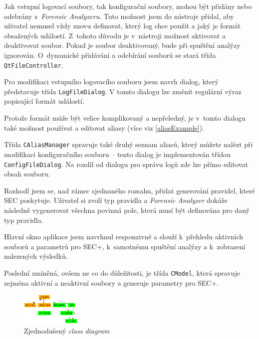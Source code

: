 \documentclass[thesis=B,czech]{FITthesis}[2012/06/26]
\begin{document}
Jak vstupní logovací soubory, tak konfigurační soubory, mohou být přidány nebo odebrány z~\textit{Forensic Analyzeru}. Tuto možnost jsem do nástroje přidal, aby uživatel nemusel vždy znovu definovat, který log chce použít a jaký je formát obsažených událostí. Z~tohoto důvodu je v~nástroji možnost aktivovat a deaktivovat soubor. Pokud je soubor deaktivovaný, bude při spuštění analýzy ignorován. O~dynamické přidávání a odebírání souborů se stará třída \texttt{QtFileController}.

Pro modifikaci vstupního logovacího souboru jsem navrh dialog, který představuje třída \texttt{LogFileDialog}. V tomto dialogu lze změnit regulární výraz popisující formát událostí. 

Protože formát může být velice komplikovaný a nepřeledný, je v~tomto dialogu také možnost používat a editovat aliasy (více viz \ref{aliasExample}).

Třída \texttt{CAliasManager} spravuje také druhý seznam aliasů, který můžete nalézt při modifikaci konfiguračního souboru -- tento dialog je implementován třídou \texttt{ConfigFileDialog}.
Na rozdíl od dialogu pro správu logů zde lze přímo editovat obsah souboru. 

Rozhodl jsem se, nad rámec sjednaného rozsahu, přidat generování pravidel, které SEC poskytuje. Uživatel si zvolí typ pravidla a \textit{Forensic Analyzer} dokáže následně vygenerovat všechna povinná pole, která musí být definována pro daný typ pravidla.

Hlavní okno aplikace jsem navrhnul responzivně a slouží k~přehledu aktivních souborů a parametrů pro SEC+, k~samotnému spuštění analýzy a k~zobrazení nalezených výsledků.

Poslední zmíněná, ovšem ne co do důležitosti, je třída \texttt{CModel}, která spravuje zejména aktivní a neaktivní soubory a generuje parametry pro SEC+.

\begin{figure}[h]
  \centering
  \includegraphics[width=\textwidth]{res/ClassDiagramSimple.eps}
  \caption{Zjednodušený \textit{class diagram}}
  \label{fig:ClassDiagramSimple}
\end{figure}
\end{document}
